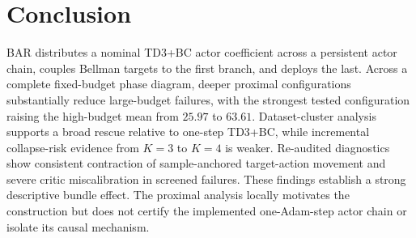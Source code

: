\section{Conclusion}
\label{sec:conclusion}

BAR distributes a nominal TD3+BC actor coefficient across a persistent actor chain, couples Bellman targets to the first branch, and deploys the last. Across a complete fixed-budget phase diagram, deeper proximal configurations substantially reduce large-budget failures, with the strongest tested configuration raising the high-budget mean from $25.97$ to $63.61$. Dataset-cluster analysis supports a broad rescue relative to one-step TD3+BC, while incremental collapse-risk evidence from $K=3$ to $K=4$ is weaker. Re-audited diagnostics show consistent contraction of sample-anchored target-action movement and severe critic miscalibration in screened failures. These findings establish a strong descriptive bundle effect. The proximal analysis locally motivates the construction but does not certify the implemented one-Adam-step actor chain or isolate its causal mechanism.
